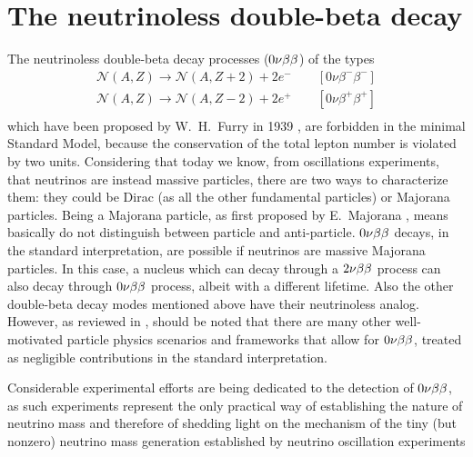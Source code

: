 \section*{The neutrinoless double-beta decay}
	The neutrinoless double-beta decay processes ($0\nu\beta\beta$) of the types
\begin{equation*}
	\begin{split}
		\mathcal{N}(A,Z)\longrightarrow \mathcal{N}(A,Z+2)+2e^- \qquad [0\nu\beta^-\beta^-] \\
		\mathcal{N}(A,Z)\longrightarrow \mathcal{N}(A,Z-2)+2e^+ \qquad [0\nu\beta^+\beta^+] \\
	\end{split}
\end{equation*}
which have been proposed by W.~H.~Furry in 1939 \cite{PhysRev.56.1184}, are forbidden in the minimal Standard Model, because the conservation of the total lepton number is violated by two units. Considering that today we know, from oscillations experiments, that neutrinos are instead massive particles, there are two ways to characterize them: they could be Dirac (as all the other fundamental particles) or Majorana particles. Being a Majorana particle, as first proposed by E.~Majorana \cite{Majorana1932}, means basically do not distinguish between particle and anti-particle. $0\nu\beta\beta$ decays, in the standard interpretation, are possible if neutrinos are massive Majorana particles. In this case, a nucleus which can decay through a $2\nu\beta\beta$ process can also decay through $0\nu\beta\beta$ process, albeit with a different lifetime. Also the other double-beta decay modes mentioned above have their neutrinoless analog. However, as reviewed in \cite{Rodejohann:2011mu}, should be noted that there are many other well-motivated particle physics scenarios and frameworks that allow for $0\nu\beta\beta$, treated as negligible contributions in the standard interpretation.

	Considerable experimental efforts are being dedicated to the detection of $0\nu\beta\beta$, as such experiments represent the only practical way of establishing the nature of neutrino mass and therefore of shedding light on the mechanism of the tiny (but nonzero) neutrino mass generation established by neutrino oscillation experiments
